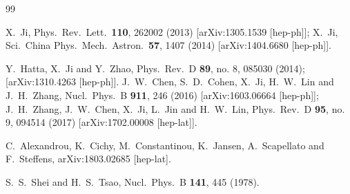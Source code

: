 \documentclass[showpacs,twocolumn,aps,preprintnumbers,letterpaper]{revtex4}
\begin{document}
\begin{thebibliography}{99} \frenchspacing



  X.~Ji,
  Phys.\ Rev.\ Lett.\  {\bf 110}, 262002 (2013)
  [arXiv:1305.1539 [hep-ph]];
  X.~Ji,
  Sci.\ China Phys.\ Mech.\ Astron.\  {\bf 57}, 1407 (2014)
  [arXiv:1404.6680 [hep-ph]].


  Y.~Hatta, X.~Ji and Y.~Zhao,
  Phys.\ Rev.\ D {\bf 89}, no. 8, 085030 (2014);
  [arXiv:1310.4263 [hep-ph]].
  J.~W.~Chen, S.~D.~Cohen, X.~Ji, H.~W.~Lin and J.~H.~Zhang,
  Nucl.\ Phys.\ B {\bf 911}, 246 (2016)
  [arXiv:1603.06664 [hep-ph]];
  J.~H.~Zhang, J.~W.~Chen, X.~Ji, L.~Jin and H.~W.~Lin,
  Phys.\ Rev.\ D {\bf 95}, no. 9, 094514 (2017)
  [arXiv:1702.00008 [hep-lat]].


  C.~Alexandrou, K.~Cichy, M.~Constantinou, K.~Jansen, A.~Scapellato and F.~Steffens,
  arXiv:1803.02685 [hep-lat].


  S.~S.~Shei and H.~S.~Tsao,
  Nucl.\ Phys.\ B {\bf 141}, 445 (1978).







\end{thebibliography}
\end{document}
